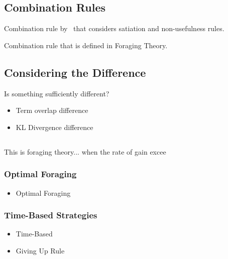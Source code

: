 \subsection{Combination Rules}
Combination rule by~\citealt{kraft1979stopping_rules} that considers satiation and non-usefulness rules.

Combination rule that is defined in Foraging Theory.

\subsection{Considering the Difference}
Is something sufficiently different?


\begin{itemize}
    \item[\blueboxbold{SS5}] Term overlap difference
\end{itemize}

\begin{itemize}
    \item[\blueboxbold{SS6}] KL Divergence difference
\end{itemize}

\subsection{}
This is foraging theory... when the rate of gain excee

\subsubsection{Optimal Foraging}

\begin{itemize}
    \item[\blueboxbold{SS7}] Optimal Foraging
\end{itemize}

\subsubsection{Time-Based Strategies}

\begin{itemize}
    \item[\blueboxbold{SS8}] Time-Based
\end{itemize}

\begin{itemize}
    \item[\blueboxbold{SS9}] Giving Up Rule
\end{itemize}

